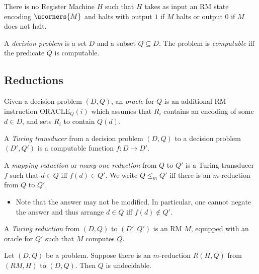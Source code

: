 \documentclass{article}
\begin{document}
\begin{theorem*}
	There is no Register Machine $H$ such that $H$ takes as input an RM state encoding
	$\ucorners{M}$ and halts with output $1$ if $M$ halts or output $0$ if $M$ does not halt.
\end{theorem*}


\begin{definition*}
	A \emph{decision problem} is a set $D$ and a subset $Q\subseteq D$.
	The problem is \emph{computable} iff the predicate $Q$ is computable.
\end{definition*}

\subsection{Reductions}

\begin{definition*}[Oracle]
	Given a decision problem $(D,Q)$, an \emph{oracle} for $Q$ is an additional
	RM instruction $\text{ORACLE}_Q(i)$ which assumes that $R_i$ contains an
	encoding of some $d\in D$, and sets $R_i$ to contain $Q(d)$.
\end{definition*}

\begin{definition*}
	A \emph{Turing transducer} from a decision problem $(D,Q)$ to a decision problem 
	$(D',Q')$ is a computable function $f:D\to D'$.
\end{definition*}

\begin{definition*}[m-reduction]
	A \emph{mapping reduction} or \emph{many-one reduction} from $Q$ to $Q'$ is a
	Turing transducer $f$ such that $d\in Q$ iff $f(d)\in Q'$. We write $Q\leq_m Q'$
	iff there is an $m$-reduction from $Q$ to $Q'$.
	\begin{itemize}
		\item Note that the answer may not be modified. In particular, one cannot negate 
			the answer and thus arrange $d\in Q$ iff $f(d)\not\in Q'$.
	\end{itemize}
\end{definition*}

\begin{definition*}
	A \emph{Turing reduction} from $(D,Q)$ to $(D',Q')$ is an RM $M$, equipped with
	an oracle for $Q'$ such that $M$ computes $Q$.
\end{definition*}

\begin{theorem*}[Notes I.15]
	Let $(D,Q)$ be a problem. Suppose there is an $m$-reduction $R(H,Q)$ from
	$(RM, H)$ to $(D,Q)$. Then $Q$ is undecidable.
\end{theorem*}
\end{document}
